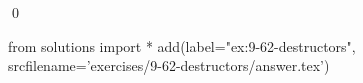 
\begin{ex}
  \label{ex:9-62-destructors}
  
  \qed
\end{ex}
\begin{python0}
from solutions import *
add(label="ex:9-62-destructors",
    srcfilename='exercises/9-62-destructors/answer.tex')
\end{python0}
